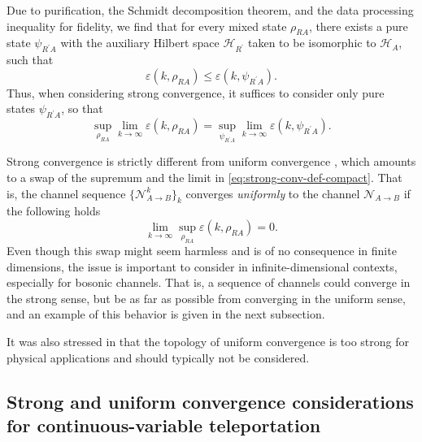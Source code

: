 \documentclass[apsrev,twocolumn]{revtex4-1}%
\begin{document}
Due to purification, the Schmidt decomposition theorem, and the data
processing inequality for fidelity, we find that for every mixed state
$\rho_{RA}$, there exists a pure state $\psi_{R^{\prime}A}$ with the auxiliary
Hilbert space $\mathcal{H}_{R^{\prime}}$ taken to be isomorphic to
$\mathcal{H}_{A}$, such that%
\begin{equation}
\varepsilon(k,\rho_{RA})\leq\varepsilon(k,\psi_{R^{\prime}A}).
\end{equation}
Thus, when considering strong convergence, it suffices to consider only pure
states $\psi_{R^{\prime}A}$, so that%
\begin{equation}
\sup_{\rho_{RA}}\lim_{k\rightarrow\infty}\varepsilon(k,\rho_{RA})=\sup
_{\psi_{R^{\prime}A}}\lim_{k\rightarrow\infty}\varepsilon(k,\psi_{R^{\prime}%
A}). \label{eq:pure-state-mixed-state}%
\end{equation}


Strong convergence is strictly different from uniform convergence
\cite[Section~3]{SH08}, which amounts to a swap of the supremum and the limit
in \eqref{eq:strong-conv-def-compact}. That is, the channel sequence
$\{\mathcal{N}_{A\rightarrow B}^{k}\}_{k}$ converges \textit{uniformly} to the
channel $\mathcal{N}_{A\rightarrow B}$ if the following holds%
\begin{equation}
\lim_{k\rightarrow\infty}\sup_{\rho_{RA}}\varepsilon(k,\rho_{RA})=0.
\end{equation}
Even though this swap might seem harmless and is of no consequence in finite
dimensions, the issue is important to consider in infinite-dimensional
contexts, especially for bosonic channels. That is, a sequence of channels
could converge in the strong sense, but be as far as possible from converging
in the uniform sense, and an example of this behavior is given in the next subsection.

It was also stressed in \cite{SH08} that the topology of uniform convergence
is too strong for physical applications and should typically not be
considered.


\subsection{Strong and uniform convergence considerations for
continuous-variable teleportation}
\end{document}
